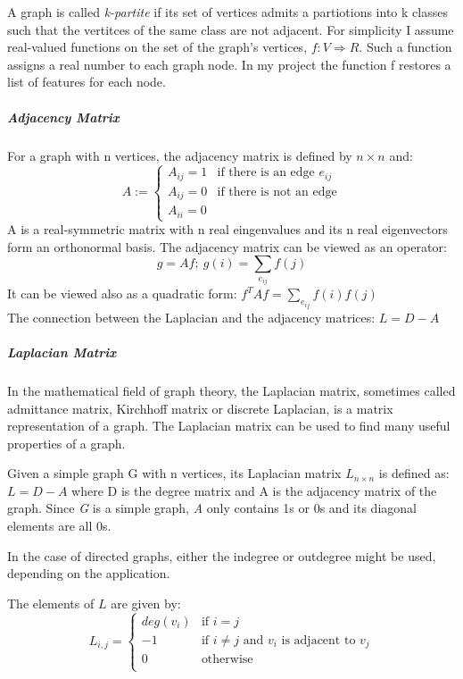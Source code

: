 \documentclass{report}
\begin{document}
A graph is called \textit{k-partite} if its set of vertices admits a partiotions into k classes such that the vertitces of the same class are not adjacent.
For simplicity I assume real-valued functions on the set of the graph’s
vertices, $f : V \Rightarrow R$. Such a function assigns a real number
to each graph node. In my project the function f restores a list of features for each node.

\subparagraph{Adjacency Matrix} For a graph with n vertices, the adjacency matrix is defined by $n \times n$ and:
\begin{equation}
A := \begin{cases}
A_{ij} = 1 & \text{if there is an edge $e_{ij}$}\\
A_{ij} = 0 & \text{if there is not an edge}\\
A_{ii} = 0 
\end{cases}
\end{equation}
A is a real-symmetric matrix with n real eingenvalues and its n real eigenvectors form an orthonormal basis.
The adjacency matrix can be viewed as an operator:
\begin{equation}
 g = Af;\ g(i) = \sum_{e_{ij}} f(j) 
 \end{equation}
It can be viewed also as a quadratic form:
$f^T A f =  \sum_{e_{ij}} f(i)f(j) $\\
The connection between the Laplacian and the adjacency matrices:
 $L = D - A$

\subparagraph{Laplacian Matrix}
In the mathematical field of graph theory, the Laplacian matrix, sometimes called admittance matrix, Kirchhoff matrix or discrete Laplacian, is a matrix representation of a graph. The Laplacian matrix can be used to find many useful properties of a graph.

Given a simple graph G with n vertices, its Laplacian matrix $L_{n\times n} $ is defined as: $ L = D-A$ 
where D is the degree matrix and A is the adjacency matrix of the graph. Since \textit{G} is a simple graph, \textit{A} only contains 1s or 0s and its diagonal elements are all 0s.

In the case of directed graphs, either the indegree or outdegree might be used, depending on the application.

The elements of $L$ are given by:
\begin{equation}
L_{i,j}= 
\begin{cases}
deg(v_i) & \text{if $i=j$}\\
-1 &	\text{if $i \neq j$ and $v_i$ is adjacent to $v_j$}\\
0 &\text{otherwise}\\
\end{cases}
\end{equation}
\end{document}

